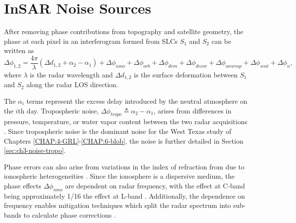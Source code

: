 \section{InSAR Noise Sources}
\label{sec:ch3-noise}
%
After removing phase contributions from topography and satellite geometry, the phase at each pixel in an interferogram formed from SLCs $S_1$ and $S_2$ can be written as
\begin{equation}
	\Delta \phi_{1, 2} = \frac{4 \pi}{\lambda} \left( \Delta d_{1,2} + \alpha_2 - \alpha_1 \right) + \Delta \phi_{iono} + \Delta \phi_{orb} + \Delta \phi_{dem} + \Delta \phi_{decor} + \Delta \phi_{unwrap} + \Delta \phi_{scat} + \Delta \phi_{n}  ,
	\label{eq:ch3-insar-noise-terms}
\end{equation}
where $ \lambda $ is the radar wavelength and $ \Delta d_{1,2} $ is the surface deformation between $S_1$ and $S_2$ along the radar LOS direction. 

The $\alpha_i$ terms represent the excess delay introduced by the neutral atmosphere on the $i$th day.
Tropospheric noise, $\Delta \phi_{tropo} \triangleq \alpha_2 - \alpha_1 $, arises from differences in pressure, temperature, or water vapor content between the two radar acquisitions \citep{Zebker1997AtmosphericEffectsInterferometric}.
Since tropospheric noise is the dominant noise for the West Texas study of Chapters \ref{CHAP:4-GRL}-\ref{CHAP:6-blob}, the noise is further detailed in Section \ref{sec:ch3-noise-tropo}.


Phase errors can also arise from variations in the index of refraction from due to ionospheric heterogeneities \citep{Gray2000InfluenceIonosphericElectron}. Since the ionosphere is a dispersive medium, the phase effects  $\Delta \phi_{iono}$ are dependent on radar frequency, with the effect at C-band being approximately 1/16 the effect at L-band \citep{Liang2019IonosphericCorrectionInsar}. Additionally, the dependence on frequency enables mitigation techniques which split the radar spectrum into sub-bands to calculate phase corrections \cite{Rosen2010MeasurementMitigationIonosphere}.


